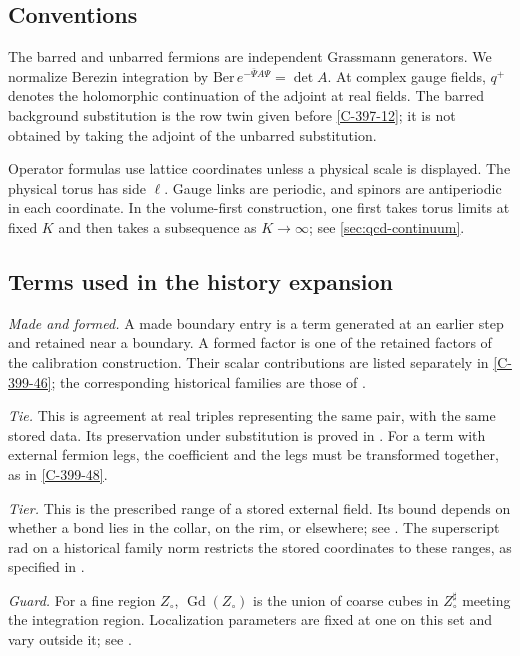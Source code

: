 \documentclass[11pt,letterpaper,reqno]{amsart}
\theoremstyle{definition}
\theoremstyle{remark}
\begin{document}
\subsection*{Conventions}

The barred and unbarred fermions are independent Grassmann
generators. We normalize Berezin integration by
$\mathrm{Ber}\,e^{-\bar\Psi A\Psi}=\det A$.
At complex gauge fields, $q^+$ denotes the holomorphic continuation
of the adjoint at real fields. The barred background substitution
is the row twin given before \cref{C-397-12}; it is not obtained
by taking the adjoint of the unbarred substitution.

Operator formulas use lattice coordinates unless a physical
scale is displayed. The physical torus has side $\ell$.
Gauge links are periodic, and spinors are antiperiodic in each
coordinate. In the volume-first construction, one first takes
torus limits at fixed $K$ and then takes a subsequence as
$K\to\infty$; see \cref{sec:qcd-continuum}.

\subsection*{Terms used in the history expansion}

\emph{Made and formed.}
A made boundary entry is a term generated at an earlier step
and retained near a boundary. A formed factor is one of the
retained factors of the calibration construction. Their
scalar contributions are listed separately in
\cref{C-399-46}; the corresponding historical families are
those of \cite[Prop.~4.126]{YMM1}.

\emph{Tie.}
This is agreement at real triples representing the same pair,
with the same stored data. Its preservation under substitution
is proved in \cite[Prop.~4.118]{YMM1}. For a term with
external fermion legs, the coefficient and the legs must be
transformed together, as in \cref{C-399-48}.

\emph{Tier.}
This is the prescribed range of a stored external field. Its
bound depends on whether a bond lies in the collar, on the rim,
or elsewhere; see \cite[\S4.14.7]{YMM1}.
The superscript $\mathrm{rad}$ on a historical family norm
restricts the stored coordinates to these ranges, as specified
in \cite[\S4.15.15]{YMM1}.

\emph{Guard.}
For a fine region $Z_\circ$, $\operatorname{Gd}(Z_\circ)$ is
the union of coarse cubes in $Z_\circ^\sharp$ meeting the
integration region. Localization parameters are fixed at one
on this set and vary outside it; see
\cite[\S4.14.3]{YMM1}.
\end{document}
